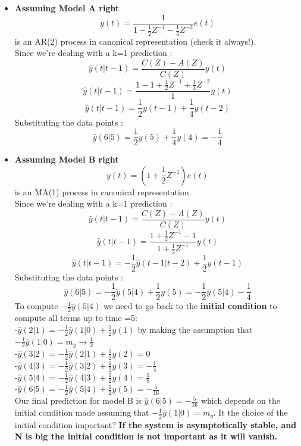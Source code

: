 \begin{itemize}
\item \textbf{Assuming Model A right}\hfill\\
$$ y(t) = \frac{1}{1-\frac{1}{2}Z^{-1}-\frac{1}{4}Z^{-2}} e(t)$$ is an AR(2) process in canonical representation (check it always!).\\
Since we're dealing with a k=1 prediction : 
$$ \hat{y}(t|t-1) = \frac{C(Z)-A(Z)}{C(Z)}y(t)$$
$$ \hat{y}(t|t-1) = \frac{1-1+\frac{1}{2}Z^{-1}+\frac{1}{4}Z^{-2}}{1}y(t)$$
$$ \hat{y}(t|t-1) = \frac{1}{2}y(t-1) + \frac{1}{4}y(t-2)$$
Substituting the data points :
$$ \hat{y}(6|5) = \frac{1}{2}y(5) + \frac{1}{4}y(4) = -\frac{1}{4}$$
\item \textbf{Assuming Model B right}\hfill\\
$$ y(t) = (1+\frac{1}{2}Z^{-1})e(t) $$ is an MA(1) process in canonical representation.\\
Since we're dealing with a k=1 prediction : 
$$ \hat{y}(t|t-1) = \frac{C(Z)-A(Z)}{C(Z)}y(t)$$
$$ \hat{y}(t|t-1) = \frac{1+\frac{1}{2}Z^{-1}-1}{1+\frac{1}{2}Z^{-1}}y(t)$$
$$ \hat{y}(t|t-1) = -\frac{1}{2}\hat{y}(t-1|t-2) +\frac{1}{2}y(t-1)$$
Substituting the data points :
$$ \hat{y}(6|5) = -\frac{1}{2}\hat{y}(5|4) + \frac{1}{2}y(5) = -\frac{1}{2}\hat{y}(5|4) -\frac{1}{4}$$
To compute $-\frac{1}{2}\hat{y}(5|4)$ we need to go back to the \textbf{initial condition } to compute all terms up to time =5:\\
-$ \hat{y}(2|1) = -\frac{1}{2}\hat{y}(1|0) + \frac{1}{2}y(1)$ by making the assumption that $-\frac{1}{2}\hat{y}(1|0) = m_y \to \frac{1}{2}$\\
-$ \hat{y}(3|2) = -\frac{1}{2}\hat{y}(2|1) + \frac{1}{2}y(2) = 0$\\
-$ \hat{y}(4|3) = -\frac{1}{2}\hat{y}(3|2) + \frac{1}{2}y(3) = -\frac{1}{4}$\\
-$ \hat{y}(5|4) = -\frac{1}{2}\hat{y}(4|3) + \frac{1}{2}y(4) = \frac{1}{8}$\\
-$ \hat{y}(6|5) = -\frac{1}{2}\hat{y}(5|4) + \frac{1}{2}y(5) = -\frac{5}{16}$\\
Our final prediction for model B is $\hat{y}(6|5) = -\frac{5}{16}$ which depends on the initial condition made assuming that $-\frac{1}{2}\hat{y}(1|0) = m_y $. It the choice of the initial condition important?
\textbf{If the system is asymptotically stable, and N is big the initial condition is not important as it will vanish.}


\end{itemize}
